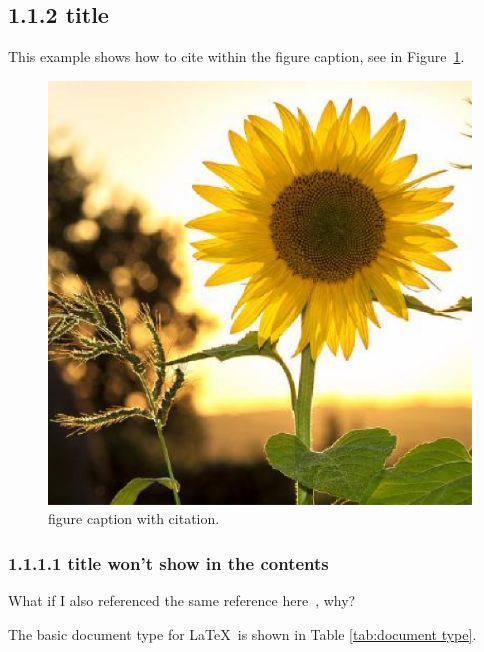\documentclass[12pt,openright]{book}
\begin{document}
\subsection{1.1.2 title}

This example shows how to cite within the figure caption, see in Figure~\ref{fig:captioncitation}.

\begin{figure}[htp]
	\centering
	\includegraphics[width=\textwidth]{flower}
	\caption[figure caption with citation.]{figure caption with citation.~\cite{ibge1993}} 
	\label{fig:captioncitation}
\end{figure}

\subsubsection{1.1.1.1 title won't show in the contents}

What if I also referenced the same reference here~\cite{ibge1993}, why?

\noindent The basic document type for \LaTeX\ is shown in Table \ref{tab:document type}.
\end{document}
